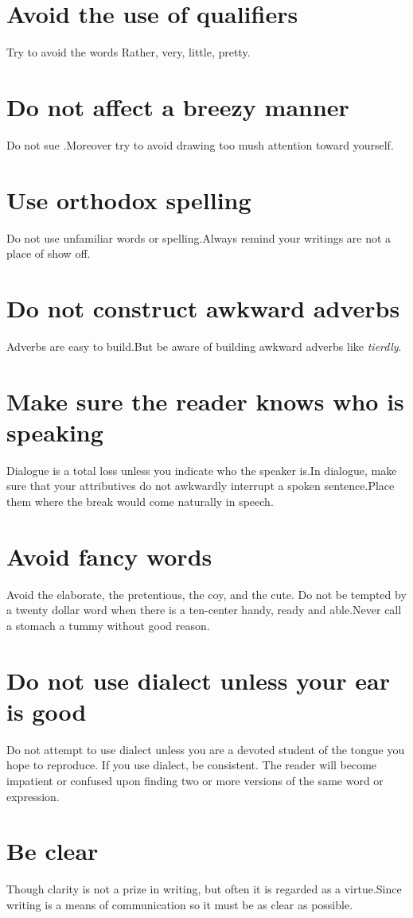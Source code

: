 \documentclass{report}
\begin{document}
\section{ Avoid the use of qualifiers}
Try to avoid the words Rather, very, little, pretty.
\section{Do not affect a breezy manner}
Do not sue .Moreover try to avoid drawing too mush attention toward yourself.
\section{Use orthodox spelling}
Do not use unfamiliar words or spelling.Always remind your writings are not a place of show off.
\section{Do not construct awkward adverbs}
Adverbs are easy to build.But be aware  of building awkward adverbs like \textit{tierdly}.   
\section{Make sure the reader knows who is speaking}
Dialogue is a total loss unless you indicate who the speaker is.In dialogue, make sure that your attributives do not awkwardly interrupt a spoken sentence.Place them where the break would come naturally in speech.
\section{Avoid fancy words}
Avoid the elaborate, the pretentious, the coy, and the cute. Do not be tempted by a twenty dollar word when there is a ten-center handy, ready and able.Never call a stomach a tummy without good reason.
\section{ Do not use dialect unless your ear is good}
Do not attempt to use dialect unless you are a devoted student of the tongue you hope to reproduce. If you use dialect, be consistent. The reader will become impatient or confused upon finding two or more versions of the same word or expression.
\section{Be clear}
Though clarity is not a prize in writing, but often it is regarded as a virtue.Since writing is a means of communication so it must be as clear as possible.
\end{document}
